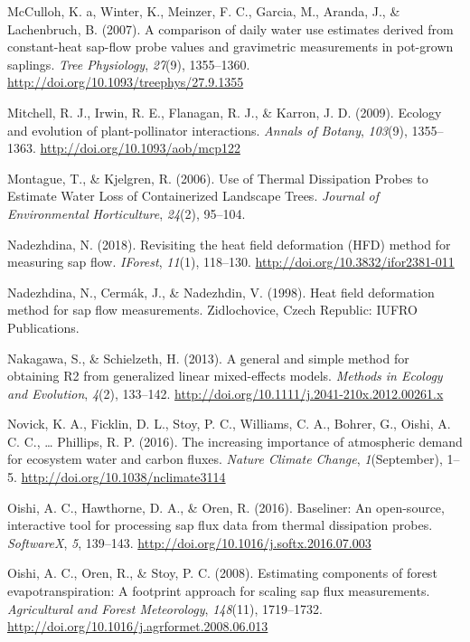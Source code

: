 \documentclass[11pt,twoside]{reedthesis}
\begin{document}
\hypertarget{ref-McCulloh2007}{}
McCulloh, K. a, Winter, K., Meinzer, F. C., Garcia, M., Aranda, J., \&
Lachenbruch, B. (2007). A comparison of daily water use estimates
derived from constant-heat sap-flow probe values and gravimetric
measurements in pot-grown saplings. \emph{Tree Physiology},
\emph{27}(9), 1355--1360.
\url{http://doi.org/10.1093/treephys/27.9.1355}

\hypertarget{ref-Mitchell2009}{}
Mitchell, R. J., Irwin, R. E., Flanagan, R. J., \& Karron, J. D. (2009).
Ecology and evolution of plant-pollinator interactions. \emph{Annals of
Botany}, \emph{103}(9), 1355--1363.
\url{http://doi.org/10.1093/aob/mcp122}

\hypertarget{ref-Montague2006}{}
Montague, T., \& Kjelgren, R. (2006). Use of Thermal Dissipation Probes
to Estimate Water Loss of Containerized Landscape Trees. \emph{Journal
of Environmental Horticulture}, \emph{24}(2), 95--104.

\hypertarget{ref-Nadezhdina2018}{}
Nadezhdina, N. (2018). Revisiting the heat field deformation (HFD)
method for measuring sap flow. \emph{IForest}, \emph{11}(1), 118--130.
\url{http://doi.org/10.3832/ifor2381-011}

\hypertarget{ref-Nadezhdina1998}{}
Nadezhdina, N., Cermák, J., \& Nadezhdin, V. (1998). Heat field
deformation method for sap flow measurements. Zidlochovice, Czech
Republic: IUFRO Publications.

\hypertarget{ref-Nakagawa2013}{}
Nakagawa, S., \& Schielzeth, H. (2013). A general and simple method for
obtaining R2 from generalized linear mixed-effects models. \emph{Methods
in Ecology and Evolution}, \emph{4}(2), 133--142.
\url{http://doi.org/10.1111/j.2041-210x.2012.00261.x}

\hypertarget{ref-Novick2016}{}
Novick, K. A., Ficklin, D. L., Stoy, P. C., Williams, C. A., Bohrer, G.,
Oishi, A. C. C., \ldots{} Phillips, R. P. (2016). The increasing
importance of atmospheric demand for ecosystem water and carbon fluxes.
\emph{Nature Climate Change}, \emph{1}(September), 1--5.
\url{http://doi.org/10.1038/nclimate3114}

\hypertarget{ref-Oishi2016}{}
Oishi, A. C., Hawthorne, D. A., \& Oren, R. (2016). Baseliner: An
open-source, interactive tool for processing sap flux data from thermal
dissipation probes. \emph{SoftwareX}, \emph{5}, 139--143.
\url{http://doi.org/10.1016/j.softx.2016.07.003}

\hypertarget{ref-Oishi2008}{}
Oishi, A. C., Oren, R., \& Stoy, P. C. (2008). Estimating components of
forest evapotranspiration: A footprint approach for scaling sap flux
measurements. \emph{Agricultural and Forest Meteorology},
\emph{148}(11), 1719--1732.
\url{http://doi.org/10.1016/j.agrformet.2008.06.013}
\end{document}
